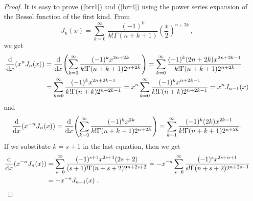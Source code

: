 \begin{proof}
It is easy to prove (\ref{brr1}) and (\ref{brr4}) using the power
series expansion of the Bessel function of the first kind.  From
\[
J_n(x) = \sum_{k=0}^{\infty} \, \frac{(-1)^k}{k! \Gamma(n+k+1)}
\left(\frac{x}{2}\right)^{n+2k} \ ,
\]
we get
\begin{align*}
\dfdx{(x^n J_n(x))}{x} &=
\dfdx{ \left(\sum_{k=0}^{\infty} \frac{(-1)^k x^{2n+2k}}
{k! \Gamma(n+k+1) 2^{n+2k}}\right) }{x}
= \sum_{k=0}^{\infty} \frac{(-1)^k (2n+2k) x^{2n+2k-1}}
{k! \Gamma(n+k+1) 2^{n+2k}} \\
&= \sum_{k=0}^{\infty} \frac{(-1)^k x^{2n+2k-1}}
{k! \Gamma(n+k) 2^{n+2k-1}}
= x^n \sum_{k=0}^{\infty} \frac{(-1)^k x^{n+2k-1}}
{k! \Gamma(n+k) 2^{n+2k-1}} = x^n J_{n-1}(x)
\end{align*}
and
\[
\dfdx{(x^{-n} J_n(x))}{x} =
\dfdx{ \left(\sum_{k=0}^{\infty} \frac{(-1)^k x^{2k}}
{k! \Gamma(n+k+1) 2^{n+2k}}\right) }{x}
= \sum_{k=1}^{\infty} \frac{(-1)^k (2k) x^{2k-1}}
{k! \Gamma(n+k+1) 2^{n+2k}} .
\]
If we substitute $k=s+1$ in the last equation, then we get
\begin{align*}
\dfdx{(x^{-n} J_n(x))}{x} 
&= \sum_{s=0}^{\infty} \frac{(-1)^{s+1} x^{2s+1}(2s+2)}
{(s+1)! \Gamma(n+s+2) 2^{n+2s+2}}
= -x^{-n} \sum_{s=0}^{\infty} \frac{(-1)^s x^{2s+n+1}}
{s! \Gamma(n+s+2) 2^{n+2s+1}}\\
& = -x^{-n} J_{n+1}(x) \ . \qedhere
\end{align*}
\end{proof}

